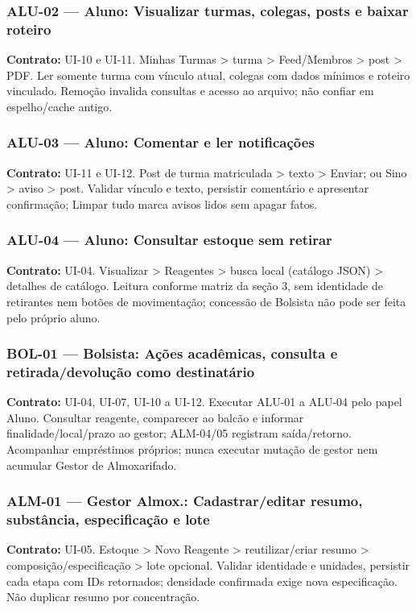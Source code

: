 \subsubsection{ALU-02 --- Aluno: Visualizar turmas, colegas, posts e baixar roteiro}
\textbf{Contrato:} UI-10 e UI-11. Minhas Turmas > turma > Feed/Membros > post > PDF. Ler somente turma com vínculo atual, colegas com dados mínimos e roteiro vinculado. Remoção invalida consultas e acesso ao arquivo; não confiar em espelho/cache antigo.

\subsubsection{ALU-03 --- Aluno: Comentar e ler notificações}
\textbf{Contrato:} UI-11 e UI-12. Post de turma matriculada > texto > Enviar; ou Sino > aviso > post. Validar vínculo e texto, persistir comentário e apresentar confirmação; Limpar tudo marca avisos lidos sem apagar fatos.

\subsubsection{ALU-04 --- Aluno: Consultar estoque sem retirar}
\textbf{Contrato:} UI-04. Visualizar > Reagentes > busca local (catálogo JSON) > detalhes de catálogo. Leitura conforme matriz da seção 3, sem identidade de retirantes nem botões de movimentação; concessão de Bolsista não pode ser feita pelo próprio aluno.

\subsubsection{BOL-01 --- Bolsista: Ações acadêmicas, consulta e retirada/devolução como destinatário}
\textbf{Contrato:} UI-04, UI-07, UI-10 a UI-12. Executar ALU-01 a ALU-04 pelo papel Aluno. Consultar reagente, comparecer ao balcão e informar finalidade/local/prazo ao gestor; ALM-04/05 registram saída/retorno. Acompanhar empréstimos próprios; nunca executar mutação de gestor nem acumular Gestor de Almoxarifado.

\subsubsection{ALM-01 --- Gestor Almox.: Cadastrar/editar resumo, substância, especificação e lote}
\textbf{Contrato:} UI-05. Estoque > Novo Reagente > reutilizar/criar resumo > composição/especificação > lote opcional. Validar identidade e unidades, persistir cada etapa com IDs retornados; densidade confirmada exige nova especificação. Não duplicar resumo por concentração.

